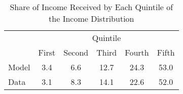 \begin{table}[H] 
\singlespace 
\center 
\caption{Share of Income Received by Each Quintile of the Income Distribution} \label{tab:income_quintile}
\vspace{-.1in} 
\begin{tabular}{l c c c c c}\hline 
\hline 
& \multicolumn{5}{c}{Quintile} \\ 
\cline{2-6}  
  & First & Second & Third & Fourth & Fifth   \\ 
 \hline 
Model &       3.4  &       6.6 &      12.7  &      24.3 &      53.0   \\ Data &       3.1  &       8.3 &      14.1  &      22.6 &      52.0   \\ \hline 
\end{tabular}
\end{table} 
